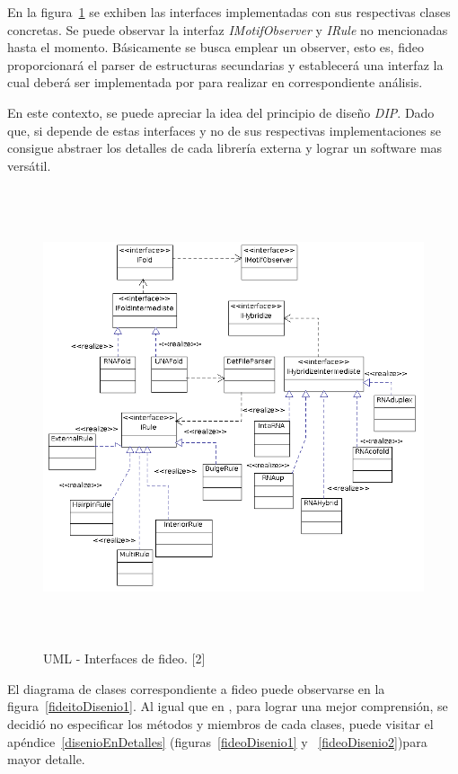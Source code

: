 En la figura~\ref{interfaceFideo} se exhiben las interfaces implementadas con sus respectivas clases concretas. Se puede observar la interfaz \emph{IMotifObserver} y \emph{IRule} no mencionadas hasta el momento. Básicamente se busca emplear un observer, esto es, fideo proporcionará el parser de estructuras secundarias y establecerá una interfaz la cual deberá ser implementada por \remo para realizar en correspondiente análisis.

\par En este contexto, se puede apreciar la idea del principio de diseño \emph{DIP}. Dado que, si \remo depende de estas interfaces y no de sus respectivas implementaciones se consigue abstraer los detalles de cada librería externa y lograr un software mas versátil. 

\begin{figure}[!hbtp]
	\begin{center}
		\includegraphics[width=15cm, height=13.5cm]{image/fideoInterface.png}
		\caption{UML - Interfaces de fideo. [2]}
		\label{interfaceFideo} 
	\end{center}
\end{figure}

\par El diagrama de clases correspondiente a fideo puede observarse en la figura~\ref{fideitoDisenio1}. Al igual que en \remo, para lograr una mejor comprensión, se decidió no especificar los métodos y miembros de cada clases, puede visitar el apéndice~\ref{disenioEnDetalles} (figuras~\ref{fideoDisenio1} y ~\ref{fideoDisenio2})para mayor detalle.

